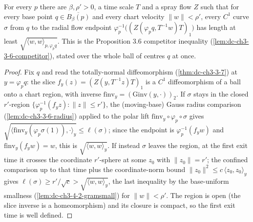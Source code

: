 \begin{lemma}
  \label{lem:dc-ch3-4-2-competitor-lb}
  \leanok
  For every $p$ there are $\beta,\rho'>0$, a time scale $T$ and a spray flow $Z$ such that for every
  base point $q\in\overline{B_\beta(p)}$ and every chart velocity $\|w\|<\rho'$, every $C^1$ curve
  $\sigma$ from $q$ to the radial flow endpoint $\varphi_p^{-1}\big((Z(\varphi_p q,T^{-1}w)T)_1\big)$
  has length at least $\sqrt{\langle w,w\rangle_{p,\varphi_p q}}$. This is the Proposition 3.6
  competitor inequality (\cref{lem:dc-ch3-3-6-competitor}), stated over the whole ball of centres $q$
  at once.
\end{lemma}
\begin{proof}
  \sketch
  \leanok
  Fix $q$ and read the totally-normal diffeomorphism (\cref{thm:dc-ch3-3-7}) at $y=\varphi_p q$: the
  slice $f_y(z)=(Z(y,T^{-1}z)T)_1$ is a $C^1$ diffeomorphism of a ball onto a chart region, with
  inverse $\mathrm{finv}_y=(\mathrm{Ginv}(y,\cdot))_2$. If $\sigma$ stays in the closed $r'$-region
  $\{\varphi_p^{-1}(f_y z):\|z\|\le r'\}$, the (moving-base) Gauss radius comparison
  (\cref{lem:dc-ch3-3-6-radius}) applied to the polar lift $\mathrm{finv}_y\circ\varphi_p\circ\sigma$
  gives $\sqrt{\langle\mathrm{finv}_y(\varphi_p\sigma(1)),\cdot\rangle_y}\le\ell(\sigma)$; since the
  endpoint is $\varphi_p^{-1}(f_y w)$ and $\mathrm{finv}_y(f_y w)=w$, this is
  $\sqrt{\langle w,w\rangle_y}$. If instead $\sigma$ leaves the region, at the first exit time it
  crosses the coordinate $r'$-sphere at some $z_0$ with $\|z_0\|=r'$; the confined comparison up to
  that time plus the coordinate-norm bound $\|z_0\|^2\le c\,\langle z_0,z_0\rangle_y$ gives
  $\ell(\sigma)\ge r'/\sqrt c>\sqrt{\langle w,w\rangle_y}$, the last inequality by the base-uniform
  smallness (\cref{lem:dc-ch3-4-2-gramsmall}) for $\|w\|<\rho'$. The region is open (the slice inverse
  is a homeomorphism) and its closure is compact, so the first exit time is well defined.
\end{proof}

